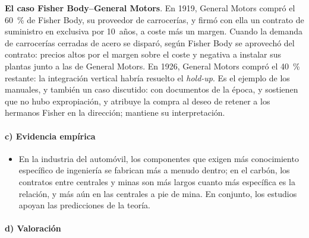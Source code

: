 \documentclass[11pt]{article}
\begin{document}
\begin{anotaciones}
\textbf{El caso Fisher Body–General Motors}. En 1919, General Motors compró el 60~\% de Fisher Body, su proveedor de carrocerías, y firmó con ella un contrato de suministro en exclusiva por 10~años, a coste más un margen. Cuando la demanda de carrocerías cerradas de acero se disparó, según \textcite{KleinCrawfordAlchian1978Vertical} Fisher Body se aprovechó del contrato: precios altos por el margen sobre el coste y negativa a instalar sus plantas junto a las de General Motors. En 1926, General Motors compró el 40~\% restante: la integración vertical habría resuelto el \emph{hold-up}. Es el ejemplo de los manuales, y también un caso discutido: con documentos de la época, \textcite{Coase2000Acquisition} y \textcite{CasadesusMasanellSpulber2000Fable} sostienen que no hubo expropiación, y \textcite{Freeland2000Creating} atribuye la compra al deseo de retener a los hermanos Fisher en la dirección; \textcite{Klein2000Fisher} mantiene su interpretación.
\end{anotaciones}

\paragraph{c) Evidencia empírica}

\begin{itemize}
\item En la industria del automóvil, los componentes que exigen más conocimiento específico de ingeniería se fabrican más a menudo dentro\nocite{MonteverdeTeece1982Supplier}; en el carbón, los contratos entre centrales y minas son más largos cuanto más específica es la relación, y más aún en las centrales a pie de mina\nocite{Joskow1987Contract}. En conjunto, los estudios apoyan las predicciones de la teoría\nocite{LafontaineSlade2007Vertical}.
\end{itemize}

\paragraph{d) Valoración}
\end{document}
